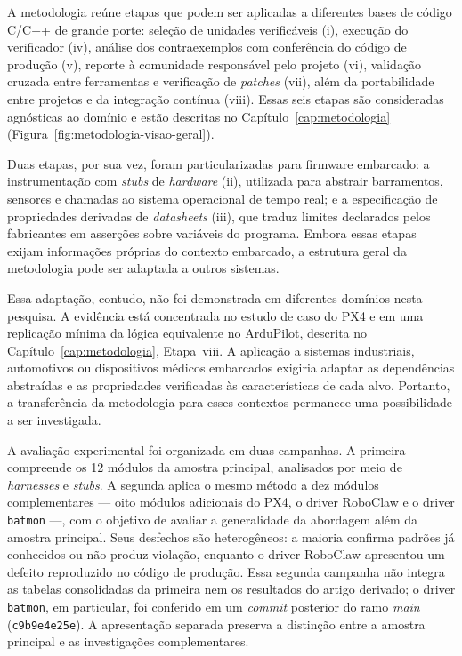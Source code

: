 A metodologia reúne etapas que podem ser aplicadas a diferentes bases de código C/C++ de grande porte: seleção de unidades verificáveis (i), execução do verificador (iv), análise dos contraexemplos com conferência do código de produção (v), reporte à comunidade responsável pelo projeto (vi), validação cruzada entre ferramentas e verificação de \textit{patches} (vii), além da portabilidade entre projetos e da integração contínua (viii). Essas seis etapas são consideradas agnósticas ao domínio e estão descritas no Capítulo~\ref{cap:metodologia} (Figura~\ref{fig:metodologia-visao-geral}).

Duas etapas, por sua vez, foram particularizadas para firmware embarcado: a instrumentação com \textit{stubs} de \textit{hardware} (ii), utilizada para abstrair barramentos, sensores e chamadas ao sistema operacional de tempo real; e a especificação de propriedades derivadas de \textit{datasheets} (iii), que traduz limites declarados pelos fabricantes em asserções sobre variáveis do programa. Embora essas etapas exijam informações próprias do contexto embarcado, a estrutura geral da metodologia pode ser adaptada a outros sistemas.

Essa adaptação, contudo, não foi demonstrada em diferentes domínios nesta pesquisa. A evidência está concentrada no estudo de caso do PX4 e em uma replicação mínima da lógica equivalente no ArduPilot, descrita no Capítulo~\ref{cap:metodologia}, Etapa~viii. A aplicação a sistemas industriais, automotivos ou dispositivos médicos embarcados exigiria adaptar as dependências abstraídas e as propriedades verificadas às características de cada alvo. Portanto, a transferência da metodologia para esses contextos permanece uma possibilidade a ser investigada.

A avaliação experimental foi organizada em duas campanhas. A primeira compreende os 12 módulos da amostra principal, analisados por meio de \textit{harnesses} e \textit{stubs}. A segunda aplica o mesmo método a dez módulos complementares --- oito módulos adicionais do PX4, o driver RoboClaw e o driver \texttt{batmon} ---, com o objetivo de avaliar a generalidade da abordagem além da amostra principal. Seus desfechos são heterogêneos: a maioria confirma padrões já conhecidos ou não produz violação, enquanto o driver RoboClaw apresentou um defeito reproduzido no código de produção. Essa segunda campanha não integra as tabelas consolidadas da primeira nem os resultados do artigo derivado; o driver \texttt{batmon}, em particular, foi conferido em um \textit{commit} posterior do ramo \textit{main} (\texttt{c9b9e4e25e}). A apresentação separada preserva a distinção entre a amostra principal e as investigações complementares.

